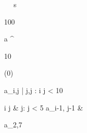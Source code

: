 \begin{eqcode}{\mu}{\ }{\ }{}
  s \gets \begin {tmatrix}
  100  \lend
  \end{tmatrix} \lend
  a \gets \genar \limits ^{\begin{tmatrix} 10  \lend \end{tmatrix}} (0) \lend

  a_{i,j} | j,j : i  \cap j < 10 \gets %
  \begin{cases}
    i \cdot j & j: j < 5 \lend
    a_{i-1, j-1} & \otherwise \lend
  \end{cases} \lend

  a_{2,7}  \lend
   \lend
\end{eqcode}
